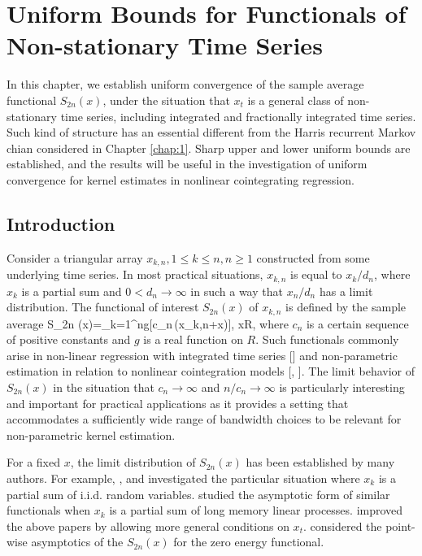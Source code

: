 
\chapter{Uniform Bounds for Functionals of Non-stationary Time Series} 
\ifpdf
    \graphicspath{{Chapter2/Chapter2Figs/PNG/}{Chapter2/Chapter2Figs/PDF/}{Chapter2/Chapter2Figs/}}
\else
    \graphicspath{{Chapter2/Chapter2Figs/EPS/}{Chapter2/Chapter2Figs/}}
\fi

In this chapter, we establish uniform convergence of the sample average functional $S_{2n}(x)$, under the situation that $x_t$ is a general class of non-stationary time series, including integrated and fractionally integrated time series. Such kind of structure has an essential different from the Harris recurrent Markov chian considered in Chapter \ref{chap:1}. Sharp upper and lower uniform bounds are established, and the results will be useful in the investigation of uniform convergence for kernel estimates in nonlinear cointegrating regression.

\section{Introduction}
Consider a triangular array ${x_{k,n},1\leq k\leq n,n\geq
1}$ constructed from some underlying time series.
In most practical situations, $x_{k,n}$ is equal to $x_k/d_n$, where $x_k$
is a partial sum and $0 < d_n\to \infty$ in such a way that $x_n/d_n$ has a limit distribution.  The functional of interest $ S_{2n}(x)$ of $x_{k,n}$ is defined by the sample average
\bestar
S_{2n} (x)=\sum_{k=1}^{n}g[c_{n}\,(x_{k,n}+x)], \quad x\in R,
\eestar
where $c_{n}$ is a certain sequence of positive constants and $g$ is
a real function on $R$. Such functionals commonly arise in non-linear regression with integrated time series [\citet[][\citeyear{parkphillips2001}]{parkphillips1999}] and non-parametric estimation in relation to nonlinear cointegration models [\cite{phillipspark1998}, \cite{karlsentjostheim2001}]. The limit behavior of $S_{2n}(x)$ in the situation that $c_{n}\rightarrow \infty $ and $n/c_{n}\rightarrow \infty $ is particularly interesting and important for practical applications as it provides a setting that accommodates a sufficiently wide range of bandwidth choices to be relevant for non-parametric kernel estimation.

For a fixed $x$, the limit distribution of $S_{2n}(x)$ has been established by many authors. For example, \cite{borodinibragimov1995}, \cite{akonom1993} and \cite{phillipspark1998} investigated the particular situation where $x_{k}$ is a partial sum of i.i.d. random variables. \cite{jeganathan2004} studied the asymptotic form of similar functionals when $x_{k}$ is a partial sum of long memory linear processes. \cite{wangphillips2010a} improved the above papers by allowing more general conditions on $x_t$.  \cite{wangphillips2010b} considered the point-wise asymptotics of the $S_{2n}(x)$ for the zero energy functional.  

